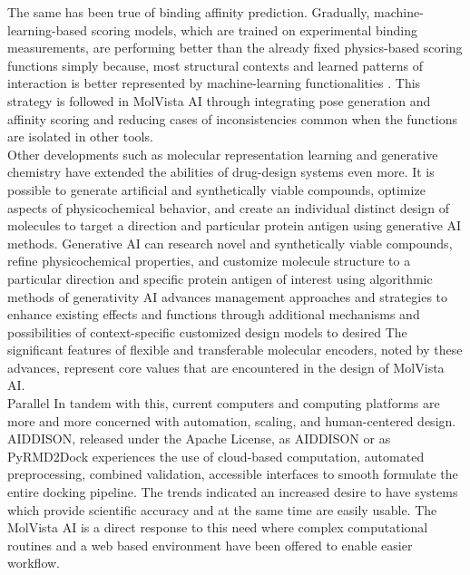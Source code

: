 \documentclass[12pt,a4]{report}
\begin{document}
\hspace{0.3in}The same has been true of binding affinity prediction. Gradually, machine-learning-based scoring models, which are trained on experimental binding measurements, are performing better than the already fixed physics-based scoring functions simply because, most structural contexts and learned patterns of interaction is better represented by machine-learning functionalities \cite{borah2024aipowered}. This strategy is followed in MolVista AI through integrating pose generation and affinity scoring and reducing cases of inconsistencies common when the functions are isolated in other tools.\\

\hspace{0.3in}Other developments such as molecular representation learning and generative chemistry have extended the abilities of drug-design systems even more. It is possible to generate artificial and synthetically viable compounds, optimize aspects of physicochemical behavior, and create an individual distinct design of molecules to target a direction and particular protein antigen using generative AI methods\cite{potineni2025generative, das2025precision}. Generative AI can research novel and synthetically viable compounds, refine physicochemical properties, and customize molecule structure to a particular direction and specific protein antigen of interest using algorithmic methods of generativity AI advances management approaches and strategies to enhance existing effects and functions through additional mechanisms and possibilities of context-specific customized design models to desired The significant features of flexible and transferable molecular encoders, noted by these advances, represent core values that are encountered in the design of MolVista AI.\\

\hspace{0.3in}Parallel In tandem with this, current computers and computing platforms are more and more concerned with automation, scaling, and human-centered design. AIDDISON, released under the Apache License, as AIDDISON \cite{rusinko2023aiddison} or as PyRMD2Dock \cite{roggia2023pyrmd2dock}  experiences the use of cloud-based computation, automated preprocessing, combined validation, accessible interfaces to smooth formulate the entire docking pipeline. The trends indicated an increased desire to have systems which provide scientific accuracy and at the same time are easily usable. The MolVista AI is a direct response to this need where complex computational routines and a web based environment have been offered to enable easier workflow.\\
\end{document}
